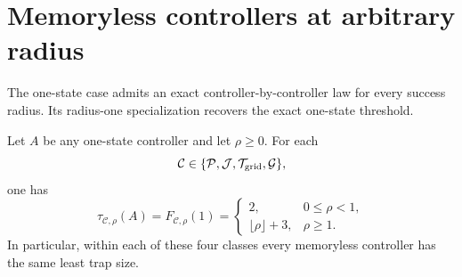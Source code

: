 \section{Memoryless controllers at arbitrary radius}\label{sec:memoryless-radius}

The one-state case admits an exact controller-by-controller law for every success radius.  Its radius-one specialization recovers the exact one-state threshold.

\begin{theorem}\label{thm:memoryless-radius}
Let $A$ be any one-state controller and let $\rho\ge0$.  For each
\[
 \mathcal C\in\{\mathcal P,\mathcal J,\mathcal T_{\rm grid},\mathcal G\},
\]
one has
\[
 \boxed{
 \tau_{\mathcal C,\rho}(A)=F_{\mathcal C,\rho}(1)=
 \begin{cases}
 2,&0\le\rho<1,\\[1mm]
 \lfloor\rho\rfloor+3,&\rho\ge1.
 \end{cases}}
\]
In particular, within each of these four classes every memoryless controller has the same least trap size.
\end{theorem}
